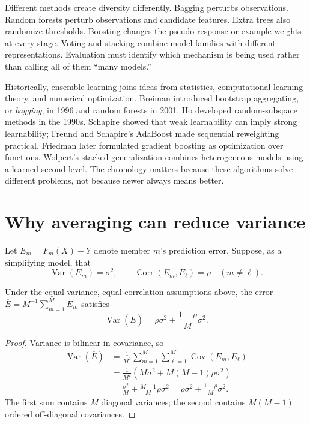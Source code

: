 Different methods create diversity differently. Bagging perturbs observations.
Random forests perturb observations and candidate features. Extra trees also
randomize thresholds. Boosting changes the pseudo-response or example weights
at every stage. Voting and stacking combine model families with different
representations. Evaluation must identify which mechanism is being used rather
than calling all of them ``many models.''

Historically, ensemble learning joins ideas from statistics, computational
learning theory, and numerical optimization. Breiman introduced bootstrap
aggregating, or \emph{bagging}, in 1996 and random forests in 2001. Ho developed
random-subspace methods in the 1990s. Schapire showed that weak learnability can
imply strong learnability; Freund and Schapire's AdaBoost made sequential
reweighting practical. Friedman later formulated gradient boosting as
optimization over functions. Wolpert's stacked generalization combines
heterogeneous models using a learned second level. The chronology matters
because these algorithms solve different problems, not because newer always
means better.

\section{Why averaging can reduce variance}

Let $E_m=F_m(X)-Y$ denote member $m$'s prediction error. Suppose, as a
simplifying model, that
\[
  \operatorname{Var}(E_m)=\sigma^2,
  \qquad
  \operatorname{Corr}(E_m,E_\ell)=\rho\quad(m\ne\ell).
\]

\begin{theorem}
Under the equal-variance, equal-correlation assumptions above, the error
$\overline E=M^{-1}\sum_{m=1}^{M}E_m$ satisfies
\[
  \operatorname{Var}(\overline E)
  =\rho\sigma^2+\frac{1-\rho}{M}\sigma^2.
\]
\end{theorem}

\begin{proof}
Variance is bilinear in covariance, so
\[
\begin{aligned}
\operatorname{Var}(\overline E)
&=\frac{1}{M^2}
  \sum_{m=1}^{M}\sum_{\ell=1}^{M}\operatorname{Cov}(E_m,E_\ell)\\
&=\frac{1}{M^2}
  \left(M\sigma^2+M(M-1)\rho\sigma^2\right)\\
&=\frac{\sigma^2}{M}+\frac{M-1}{M}\rho\sigma^2
 =\rho\sigma^2+\frac{1-\rho}{M}\sigma^2.
\end{aligned}
\]
The first sum contains $M$ diagonal variances; the second contains
$M(M-1)$ ordered off-diagonal covariances.
\end{proof}

